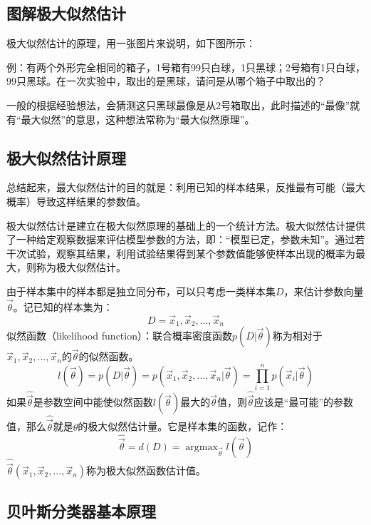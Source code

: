\subsection{图解极大似然估计}\label{ux56feux89e3ux6781ux5927ux4f3cux7136ux4f30ux8ba1}

极大似然估计的原理，用一张图片来说明，如下图所示：

 

​
例：有两个外形完全相同的箱子，1号箱有99只白球，1只黑球；2号箱有1只白球，99只黑球。在一次实验中，取出的是黑球，请问是从哪个箱子中取出的？

​
一般的根据经验想法，会猜测这只黑球最像是从2号箱取出，此时描述的``最像''就有``最大似然''的意思，这种想法常称为``最大似然原理''。

\subsection{极大似然估计原理}\label{ux6781ux5927ux4f3cux7136ux4f30ux8ba1ux539fux7406}

​
总结起来，最大似然估计的目的就是：利用已知的样本结果，反推最有可能（最大概率）导致这样结果的参数值。

​
极大似然估计是建立在极大似然原理的基础上的一个统计方法。极大似然估计提供了一种给定观察数据来评估模型参数的方法，即：``模型已定，参数未知''。通过若干次试验，观察其结果，利用试验结果得到某个参数值能够使样本出现的概率为最大，则称为极大似然估计。

​
由于样本集中的样本都是独立同分布，可以只考虑一类样本集$D$，来估计参数向量$\vec\theta$。记已知的样本集为：
\[
D=\vec x_{1},\vec x_{2},...,\vec x_{n}
\] 似然函数（likelihood
function）：联合概率密度函数$p(D|\vec\theta )$称为相对于$\vec x_{1},\vec x_{2},...,\vec x_{n}$的$\vec\theta$的似然函数。
\[
l(\vec\theta )=p(D|\vec\theta ) =p(\vec x_{1},\vec x_{2},...,\vec x_{n}|\vec\theta )=\prod_{i=1}^{n}p(\vec x_{i}|\vec \theta )
\]
如果$\hat{\vec\theta}$是参数空间中能使似然函数$l(\vec\theta)$最大的$\vec\theta$值，则$\hat{\vec\theta}$应该是``最可能''的参数值，那么$\hat{\vec\theta}​$就是$\theta$的极大似然估计量。它是样本集的函数，记作：
\[
\hat{\vec\theta}=d(D)= \mathop {\arg \max}_{\vec\theta} l(\vec\theta )
\]
$\hat{\vec\theta}(\vec x_{1},\vec x_{2},...,\vec x_{n})$称为极大似然函数估计值。

\subsection{贝叶斯分类器基本原理}\label{ux8d1dux53f6ux65afux5206ux7c7bux5668ux57faux672cux539fux7406}

